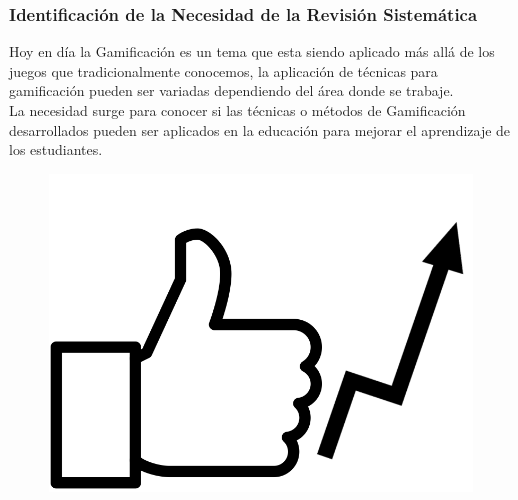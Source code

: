 \documentclass{beamer}
\begin{document}
\begin{frame}
    \frametitle{Identificación de la Necesidad de la Revisión Sistemática}
    Hoy en día la Gamificación es un tema que esta siendo aplicado más allá de los juegos que tradicionalmente conocemos, la aplicación de técnicas para gamificación pueden ser variadas dependiendo del área donde se trabaje. \\
    La necesidad surge para conocer si las técnicas o métodos de Gamificación desarrollados pueden ser aplicados en la educación para mejorar el aprendizaje de los estudiantes.
    	\begin{figure}
    		\begin{center}
    			\includegraphics[scale=0.1]{images/2icons/guide.png}
    		\end{center}
    	\end{figure}
\end{frame}
\end{document}

